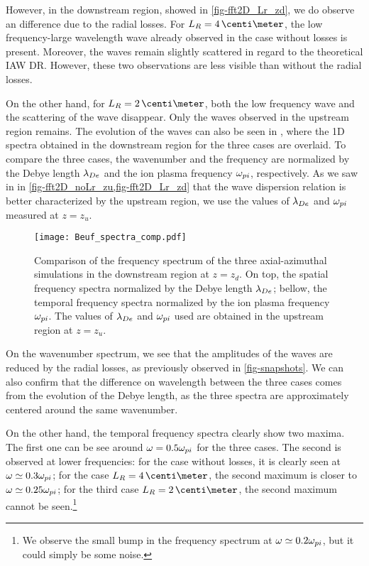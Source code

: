   However, in the downstream region, showed in \cref{fig-fft2D_Lr_zd}, we do observe an difference due to the radial losses.
  For $L_R=4\,\centi\meter$, the low frequency-large wavelength wave already observed in the case without losses is present.
  Moreover, the waves remain slightly scattered in regard to the theoretical \ac{IAW} \ac{DR}.
  However, these two observations are less visible than without the radial losses.

  On the other hand, for $L_R=2\,\centi\meter$, both the low frequency wave and the scattering of the wave disappear.
  Only the waves observed in the upstream region remains.
  The evolution of the waves can also be seen in , where the \ac{1D} spectra obtained in the downstream region for the three cases are overlaid.
  To compare the three cases, the wavenumber and the frequency are normalized by the Debye length $\lambda_{De}$ and the ion plasma frequency $\omega_{pi}$, respectively.
  As we saw in in \cref{fig-fft2D_noLr_zu,fig-fft2D_Lr_zd} that the wave dispersion relation is better characterized by the upstream region, we use the values of $\lambda_{De}$ and $\omega_{pi}$ measured at $z=z_u$.


  \begin{figure}[hbtp]
    \centering
    \texttt{[image: Beuf\_spectra\_comp.pdf]}
    \caption{Comparison of the frequency spectrum of the three axial-azimuthal simulations in the downstream region at $z=z_d$. On top, the spatial frequency spectra normalized by the Debye length $\lambda_{De}$\string; bellow, the temporal frequency spectra normalized by the ion plasma frequency $\omega_{pi}$. The values of $\lambda_{De}$ and $\omega_{pi}$ used are obtained in the upstream region at $z=z_u$.}
    \label{fig-boeuf_fft_comparasion}
  \end{figure}


  On the wavenumber spectrum, we see that the amplitudes of the waves are reduced by the radial losses, as previously observed in \cref{fig-snapshots}.
  We can also confirm that the difference on wavelength between the three cases comes from the evolution of the Debye length, as the three spectra are approximately centered around the same wavenumber.

  On the other hand, the temporal frequency spectra clearly show two maxima. 
  The first one can be see around $\omega = 0.5 \omega_{pi}$ for the three cases.
  The second is observed at lower frequencies\string: for the case without losses, it is clearly seen at  $\omega \simeq 0.3 \omega_{pi}$\string; for the case $L_R=4\,\centi\meter$, the second maximum is closer to $\omega \simeq 0.25 \omega_{pi}$\string; for the third case $L_R=2\,\centi\meter$, the second maximum cannot be seen.\footnote{We observe the small bump in the frequency spectrum at $\omega \simeq 0.2 \omega_{pi}$, but it could simply be some noise. }
  
